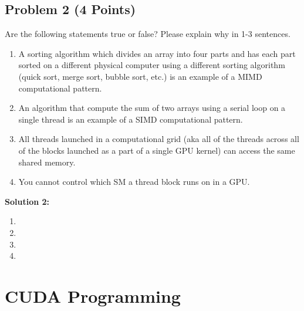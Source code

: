 \documentclass[]{article}
\begin{document}
\clearpage
\subsection*{Problem 2 (4 Points)}
Are the following statements true or false? Please explain why in 1-3 sentences.

\begin{enumerate}[label=(\alph*)]
    \item A sorting algorithm which divides an array into four parts and has each part sorted on a different physical computer using a different sorting algorithm (quick sort, merge sort, bubble sort, etc.) is an example of a MIMD computational pattern.
    \item An algorithm that compute the sum of two arrays using a serial loop on a single thread is an example of a SIMD computational pattern.
    \item All threads launched in a computational grid (aka all of the threads across all of the blocks launched as a part of a single GPU kernel) can access the same shared memory.
    \item You cannot control which SM a thread block runs on in a GPU.
\end{enumerate}

\textbf{Solution 2:}
\begin{enumerate}[label=(\alph*)]
    \item %
    \item %
    \item %
    \item %
\end{enumerate}

\clearpage
\section{CUDA Programming}
\end{document}
